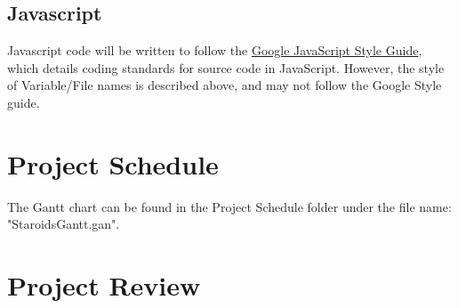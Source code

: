 \documentclass{article}
\begin{document}
\subsection{Javascript}
Javascript code will be written to follow the \href{https://google.github.io/styleguide/jsguide.html}{Google JavaScript Style Guide}, which details coding standards for source code in JavaScript. However, the style of Variable/File names is described above, and may not follow the Google Style guide.

\section{Project Schedule}
The Gantt chart can be found in the Project Schedule folder under the file name: "StaroidsGantt.gan".

\section{Project Review}




\end{document}
